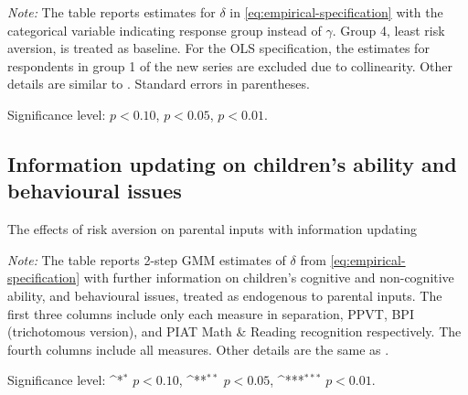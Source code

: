\documentclass[emulatestandardclasses, 10pt, abstract = true]{scrartcl}
\begin{document}
\begin{ThreePartTable}
	\begin{TableNotes}[flushleft]\footnotesize
		\item \footnotesize \textit{Note: }The table reports estimates for $\delta$ in \eqref{eq:empirical-specification} with the categorical variable indicating response group instead of $\gamma$. Group 4, least risk aversion, is treated as baseline. For the OLS specification, the estimates for respondents in group 1 of the new series are excluded due to collinearity. Other details are similar to . Standard errors in parentheses.
		\item Significance level: \sym{*} \(p<0.10\), \sym{**} \(p<0.05\), \sym{***} \(p<0.01\).\\
	\end{TableNotes}
	
\end{ThreePartTable}

\pagebreak
\subsection{Information updating on children's ability and behavioural issues}

\begin{table}[!htbp]
	\def\sym#1{\ifmmode^{#1}\else\(^{#1}\)\fi}
	\setlength{\extrarowheight}{0.3em} \centering
	\caption{The effects of risk aversion on parental inputs with information updating}
	\begin{threeparttable}
		
		\begin{tablenotes}[flushleft]\footnotesize
			\item \textit{Note:} The table reports 2-step GMM estimates of $\delta$ from \eqref{eq:empirical-specification} with further information on children's cognitive and non-cognitive ability, and behavioural issues, treated as endogenous to parental inputs. The first three columns include only each measure in separation, PPVT, BPI (trichotomous version), and PIAT Math \& Reading recognition respectively. The fourth columns include all measures. Other details are the same as . 
			\item Significance level: \sym{*} \(p<0.10\), \sym{**} \(p<0.05\), \sym{***} \(p<0.01\).\\
		\end{tablenotes}
	\end{threeparttable}
	\label{table:robust-2}
\end{table}
\end{document}
